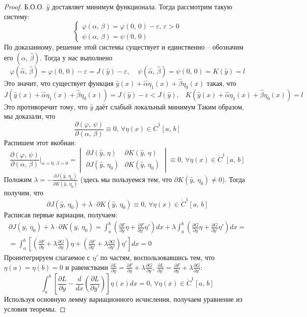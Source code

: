 \documentclass[a4paper,12pt]{article}
\renewcommand{\phi}{\ensuremath{\varphi}}
\theoremstyle{plain}
\theoremstyle{definition}
\theoremstyle{remark}
\begin{document}
\begin{proof}
	Б.О.О. $\hat{y}$ доставляет минимум функционала. Тогда рассмотрим такую систему:
	\[
		\begin{cases}
			\phi(\alpha,\,\beta) = \phi(0,\,0) - \varepsilon,\, \varepsilon > 0 \\
			\psi(\alpha,\,\beta) = \psi(0,\,0)
		\end{cases}
	\]
	По доказанному, решение этой системы существует и единственно -- обозначим его $(\hat{\alpha},\, \hat{\beta})$. Тогда у нас выполнено
	\[\phi(\hat{\alpha},\, \hat{\beta}) = \phi(0,\,0) - \varepsilon = J(\hat{y}) - \varepsilon,\;\;\;\; \psi(\hat{\alpha},\,\hat{\beta}) = \psi(0,\,0) = K(\hat{y}) = l\]
	Это значит, что существует функция $\hat{y}(x) + \hat{\alpha}\eta_1(x) + \hat{\beta}\eta_0(x)$ такая, что
	\[J(\hat{y}(x) + \hat{\alpha}\eta_1(x) + \hat{\beta}\eta_0(x)) = J(\hat{y}) - \varepsilon < J(\hat{y}),\;\;\; K(\hat{y}(x) + \hat{\alpha}\eta_1(x) + \hat{\beta}\eta_0(x)) = l\]
	Это противоречит тому, что $\hat{y}$ даёт слабый локальный минимум Таким образом, мы доказали, что
	\[\frac{\partial(\phi,\, \psi)}{\partial(\alpha,\, \beta)} \equiv 0,\, \forall \eta(x) \in \dot{C}^1[a,\,b]\]
	Распишем этот якобиан:
	\[\frac{\partial(\phi,\, \psi)}{\partial(\alpha,\, \beta)}|_{\alpha = 0,\, \beta = 0} = \begin{vmatrix}
			\partial J(\hat{y},\,\eta)   & \partial K(\hat{y},\,\eta)   \\
			\partial J(\hat{y},\,\eta_0) & \partial K(\hat{y},\,\eta_0)
		\end{vmatrix} \equiv 0,\, \forall \eta(x) \in \dot{C}^1[a,\,b]\]
	Положим $\lambda = -\frac{\partial J(\hat{y},\,\eta_0)}{\partial K(\hat{y},\, \eta_0)}$ (здесь мы пользуемся тем, что $\partial K(\hat{y},\, \eta_0) \neq 0$). Тогда получим, что
	\[\partial J(\hat{y},\,\eta_0) + \lambda\cdot\partial K(\hat{y},\, \eta_0) \equiv 0,\, \forall \eta(x) \in \dot{C}^1[a,\,b]\]
	Расписав первые вариации, получаем:
	\begin{align*}
		\partial J(y,\,\eta_0) + \lambda\cdot\partial K(y,\, \eta_0) = \int_a^b \left(\frac{\partial F}{\partial y}\eta + \frac{\partial F}{\partial y'}\eta'\right)dx + \lambda\int_a^b\left(\frac{\partial G}{\partial y}\eta + \frac{\partial G}{\partial y'}\eta'\right)dx = \\
		= \int_a^b \left[\left(\frac{\partial F}{\partial y} + \lambda\frac{\partial G}{\partial y}\right)\eta + \left(\frac{\partial F}{\partial y'} + \lambda\frac{\partial G}{\partial y'}\right)\eta'\right]dx = 0
	\end{align*}
	Проинтегрируем слагаемое с $\eta'$ по частям, воспользовавшись тем, что $\eta(a) = \eta(b) = 0$ и равенствами $\frac{\partial L}{\partial y} = \frac{\partial F}{\partial y} + \lambda\frac{\partial G}{\partial y},\, \frac{\partial L}{\partial y'} = \frac{\partial F}{\partial y'} + \lambda\frac{\partial G}{\partial y'}$:
	\[\int_a^b \left[\frac{\partial L}{\partial y} - \frac{d}{dx}\left(\frac{\partial L}{\partial y'}\right)\right]\eta(x)dx = 0,\, \forall \eta(x) \in \dot{C}^1[a,\,b]\]
	Используя основную лемму вариационного исчисления, получаем уравнение из условия теоремы.
\end{proof}
\end{document}
